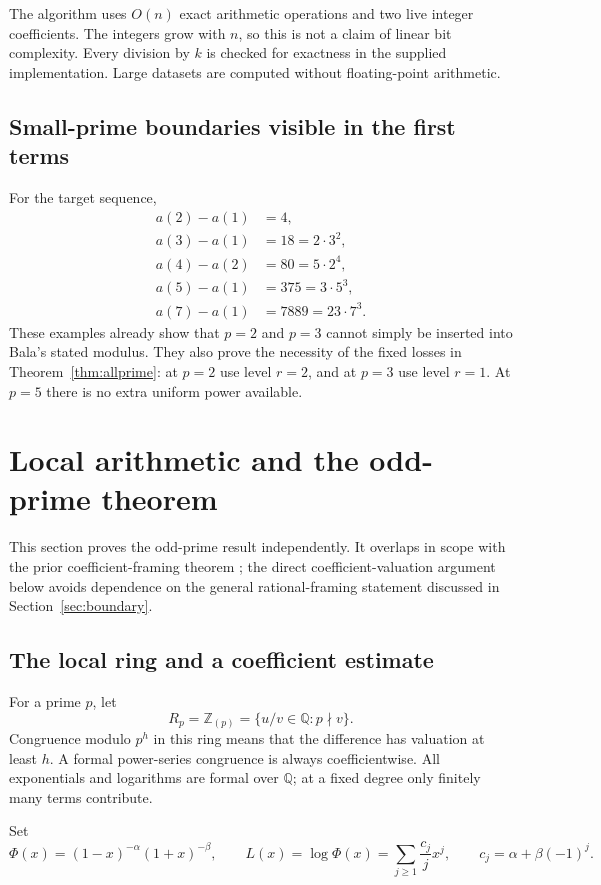 \documentclass[11pt,a4paper]{article}
\numberwithin{equation}{section}
\theoremstyle{definition}
\theoremstyle{remark}
\newcommand{\Z}{\mathbb Z}
\newcommand{\Q}{\mathbb Q}
\begin{document}
The algorithm uses $O(n)$ exact arithmetic operations and two live integer
coefficients. The integers grow with $n$, so this is not a claim of linear
bit complexity. Every division by $k$ is checked for exactness in the
supplied implementation. Large datasets are computed without floating-point
arithmetic.

\subsection{Small-prime boundaries visible in the first terms}
For the target sequence,
\begin{align*}
 a(2)-a(1)&=4,\\
 a(3)-a(1)&=18=2\cdot3^2,\\
 a(4)-a(2)&=80=5\cdot2^4,\\
 a(5)-a(1)&=375=3\cdot5^3,\\
 a(7)-a(1)&=7889=23\cdot7^3.
\end{align*}
These examples already show that $p=2$ and $p=3$ cannot simply be inserted
into Bala's stated modulus. They also prove the necessity of the fixed
losses in Theorem~\ref{thm:allprime}: at $p=2$ use level $r=2$, and at
$p=3$ use level $r=1$. At $p=5$ there is no extra uniform power available.

\section{Local arithmetic and the odd-prime theorem}
\label{sec:odd}

This section proves the odd-prime result independently. It overlaps in scope
with the prior coefficient-framing theorem \cite{prior}; the direct
coefficient-valuation argument below avoids dependence on the general
rational-framing statement discussed in Section~\ref{sec:boundary}.

\subsection{The local ring and a coefficient estimate}
For a prime $p$, let
\[
 R_p=\Z_{(p)}=\{u/v\in\Q:p\nmid v\}.
\]
Congruence modulo $p^h$ in this ring means that the difference has valuation
at least $h$. A formal power-series congruence is always coefficientwise.
All exponentials and logarithms are formal over $\Q$; at a fixed degree only
finitely many terms contribute.

Set
\begin{equation}\label{eq:phi-log}
 \Phi(x)=(1-x)^{-\alpha}(1+x)^{-\beta},\qquad
 L(x)=\log\Phi(x)=\sum_{j\ge1}\frac{c_j}{j}x^j,
 \qquad c_j=\alpha+\beta(-1)^j.
\end{equation}
\end{document}
